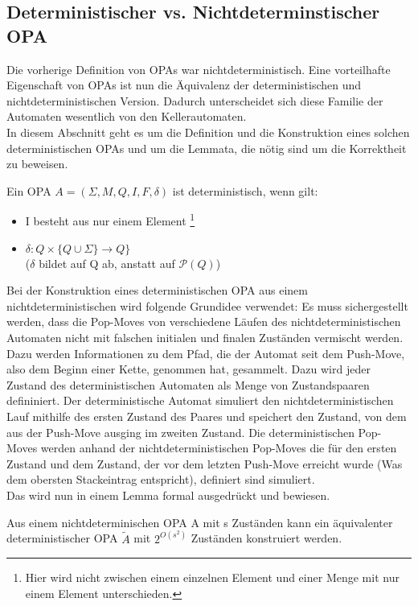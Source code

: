 \subsection{Deterministischer vs. Nichtdeterminstischer OPA}
Die vorherige Definition von OPAs war nichtdeterministisch. Eine vorteilhafte Eigenschaft von OPAs ist nun die Äquivalenz der deterministischen und nichtdeterministischen Version. Dadurch unterscheidet sich diese Familie der Automaten wesentlich von den Kellerautomaten. \\
In diesem Abschnitt geht es um die Definition und die Konstruktion eines solchen deterministischen OPAs und um die Lemmata, die nötig sind um die Korrektheit zu beweisen.
\begin{definition}
Ein OPA $A=(\Sigma, M, Q, I, F, \delta)$ ist deterministisch, wenn gilt:
\begin{itemize}
\item
I besteht aus nur einem Element \footnote{Hier wird nicht zwischen einem einzelnen Element und einer Menge mit nur einem Element unterschieden.}
\item
$\delta: Q \times \{Q \cup \Sigma\} \rightarrow Q\}$ \\
($\delta$ bildet auf Q ab, anstatt auf $\mathcal{P}(Q)$)
\end{itemize}
\end{definition}
Bei der Konstruktion eines deterministischen OPA aus einem nichtdeterministischen wird folgende Grundidee verwendet: Es muss sichergestellt werden, dass die Pop-Moves von verschiedene Läufen des nichtdeterministischen Automaten nicht mit falschen initialen und finalen Zuständen vermischt werden. Dazu werden Informationen zu dem Pfad, die der Automat seit dem Push-Move, also dem Beginn einer Kette, genommen hat, gesammelt. Dazu wird jeder Zustand des deterministischen Automaten als Menge von Zustandspaaren defininiert. Der deterministische Automat simuliert den nichtdeterministischen Lauf mithilfe des ersten Zustand des Paares und speichert den Zustand, von dem aus der Push-Move ausging im zweiten Zustand. Die deterministischen Pop-Moves werden anhand  der nichtdeterministischen Pop-Moves die für den ersten Zustand und dem Zustand, der vor dem letzten Push-Move erreicht wurde (Was dem obersten Stackeintrag entspricht), definiert sind simuliert.\\
Das wird nun in einem Lemma formal ausgedrückt und bewiesen.
\begin{lemma}
Aus einem nichtdeterminischen OPA A mit s Zuständen kann ein äquivalenter deterministischer OPA $\tilde{A}$ mit $2^{O(s^2)}$ Zuständen konstruiert werden.
\end{lemma}
